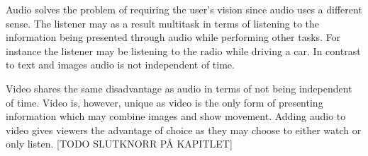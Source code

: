 Audio solves the problem of requiring the user's vision since audio uses a different sense. The listener may as a result multitask in terms of listening to the information being presented through audio while performing other tasks. For instance the listener may be listening to the radio while driving a car. In contrast to text and images audio is not independent of time.

Video shares the same disadvantage as audio in terms of not being independent of time. Video is, however, unique as video is the only form of presenting information which may combine images and show movement. Adding audio to video gives viewers the advantage of choice as they may choose to either watch or only listen.
[TODO SLUTKNORR PÅ KAPITLET]